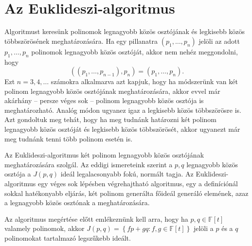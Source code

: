\documentclass[a4paper, showtrims]{memoir}
\theoremstyle{plain}
\theoremstyle{remark}
\theoremstyle{definition}
\begin{document}
\section{Az Euklideszi-algoritmus}
Algoritmust keresünk polinomok legnagyobb közös osztójának és legkisebb közös többszörösének meghatározására.
Ha egy pillanatra $\left( p_1,\ldots,p_n \right)$ jelöli az adott $p_1,\ldots,p_n$ polinomok legnagyobb közös osztóját,
akkor nem nehéz meggondolni,
hogy
\[
	\left( \left( p_1,\ldots,p_{n-1} \right),p_n \right)=\left( p_1,\ldots,p_{n}\right).
\]
Ezt $n=3,4,\ldots$ számokra alkalmazva azt kapjuk,
hogy ha módszerünk van két polinom legnagyobb közös osztójának meghatározására,
akkor evvel már akárhány -- persze véges sok -- polinom legnagyobb közös osztója is meghatározható.
Analóg módon ugyanez igaz a legkisebb közös többszörösre is.
Azt gondoltuk meg tehát, hogy ha meg tudnánk határozni két polinom legnagyobb közös osztóját és legkisebb közös többszörösét,
akkor ugyanezt már meg tudnánk tenni több polinom esetén is.

Az Euklideszi-algoritmus két polinom legnagyobb közös osztójának meghatározására szolgál.
Az eddigi ismereteink szerint a $p,q$ legnagyobb közös osztója a $J\left( p,q \right)$ ideál legalacsonyabb
fokú, normált tagja.
Az Euklideszi-algoritmus egy véges sok lépésben végrehajtható algoritmus,
egy a definíciónál sokkal hatékonyabb eljárás, két polinom generálta főideál generáló elemének,
azaz a legnagyobb közös osztónak a meghatározására.

Az algoritmus megértése előtt emlékeznünk kell arra,
hogy ha $p,q\in\mathbb{F}\left[ t \right]$ valamely polinomok, akkor
\(
J\left( p,q \right)=\left\{ fp+gq:f,g\in\mathbb{F}\left[ t \right] \right\}
\)
jelöli a $p$ és a $q$ polinomokat tartalmazó legszűkebb ideált.
\end{document}
